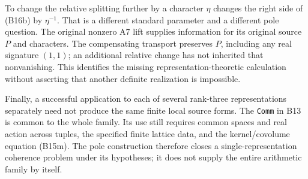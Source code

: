 To change the relative splitting further by a character $\eta$ changes the right side of (B16b) by $\eta^{-1}$. That is a different standard parameter and a different pole question. The original nonzero A7 lift supplies information for its original source $P$ and characters. The compensating transport preserves $P$, including any real signature $(1,1)$; an additional relative change has not inherited that nonvanishing. This identifies the missing representation-theoretic calculation without asserting that another definite realization is impossible.

Finally, a successful application to each of several rank-three representations separately need not produce the same finite local source forms. The \texttt{Comm} in B13 is common to the whole family. Its use still requires common spaces and real action across tuples, the specified finite lattice data, and the kernel/covolume equation (B15m). The pole construction therefore closes a single-representation coherence problem under its hypotheses; it does not supply the entire arithmetic family by itself.
